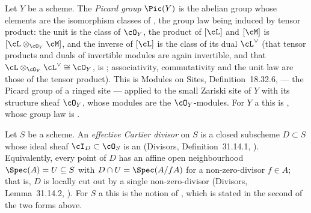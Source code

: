 \begin{definition}
\label{def:pc-picard-group}
Let $Y$ be a scheme.  The \emph{Picard group} $\Pic(Y)$ is the abelian
group whose elements are the isomorphism classes of
, the
group law being induced by tensor product: the unit is the class of
$\cO_Y$, the product of $[\cL]$ and $[\cM]$ is
$[\cL\otimes_{\cO_Y}\cM]$, and the inverse of $[\cL]$ is the class of
its dual $\cL^\vee$ (that tensor products and duals of invertible
modules are again invertible, and that
$\cL\otimes_{\cO_Y}\cL^\vee\cong\cO_Y$, is
; associativity, commutativity and
the unit law are those of the tensor product).  This is Modules on
Sites, Definition~18.32.6,  --- the Picard group of
a ringed site --- applied to the small Zariski site of $Y$ with its
structure sheaf $\cO_Y$, whose modules are the $\cO_Y$-modules.  For $Y$
a  this is ,
whose group law is .
\leanok
{}
\end{definition}

\begin{definition}
\label{def:pc-effective-cartier-divisor}
Let $S$ be a scheme.  An \emph{effective Cartier divisor} on $S$ is a
closed subscheme $D\subset S$ whose ideal sheaf $\cI_D\subset\cO_S$ is
an 
(Divisors, Definition~31.14.1, ).  Equivalently,
every point of $D$ has an affine open neighbourhood
$\Spec(A)=U\subseteq S$ with $D\cap U=\Spec(A/fA)$ for a
non-zero-divisor $f\in A$; that is, $D$ is locally cut out by a single
non-zero-divisor (Divisors, Lemma~31.14.2, ).  For
$S$ a  this is the notion of
, which is stated in the
second of the two forms above.
\end{definition}

